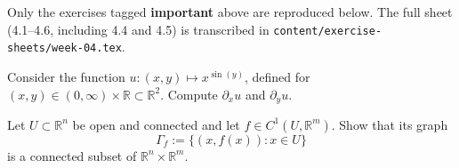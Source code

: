 \begin{ainote}
Only the exercises tagged \textbf{important} above are reproduced below. The full sheet
(4.1--4.6, including 4.4 and 4.5) is transcribed in
\texttt{content/exercise-sheets/week-04.tex}.
\end{ainote}

\begin{exercise}
\label{ex:4.1}
Consider the function $u : (x,y) \mapsto x^{\sin(y)}$, defined for
$(x,y) \in (0,\infty)\times\mathbb{R} \subset \mathbb{R}^2$. Compute $\partial_x u$ and
$\partial_y u$.
\end{exercise}

\begin{exercise}
\label{ex:4.2}
Let $U \subset \mathbb{R}^n$ be open and connected and let $f \in C^1(U, \mathbb{R}^m)$. Show that
its graph
\[\Gamma_f := \{(x, f(x)) : x \in U\}\]
is a connected subset of $\mathbb{R}^n \times \mathbb{R}^m$.
\end{exercise}

